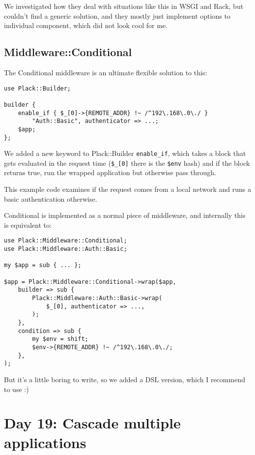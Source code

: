 We investigated how they deal with situations like this in WSGI and
Rack, but couldn't find a generic solution, and they mostly just
implement options to individual component, which did not look cool for
me.

\section{Middleware::Conditional}\label{middlewareconditional}

The Conditional middleware is an ultimate flexible solution to this:

\begin{lstlisting}
use Plack::Builder;

builder {
    enable_if { $_[0]->{REMOTE_ADDR} !~ /^192\.168\.0\./ }
        "Auth::Basic", authenticator => ...;
    $app;
};
\end{lstlisting}

We added a new keyword to Plack::Builder \lstinline!enable_if!, which
takes a block that gets evaluated in the request time (\lstinline!$_[0]!
there is the \lstinline!$env! hash) and if the block returns true, run
the wrapped application but otherwise pass through.

This example code examines if the request comes from a local network and
runs a basic authentication otherwise.

Conditional is implemented as a normal piece of middleware, and
internally this is equivalent to:

\begin{lstlisting}
use Plack::Middleware::Conditional;
use Plack::Middleware::Auth::Basic;

my $app = sub { ... };

$app = Plack::Middleware::Conditional->wrap($app,
    builder => sub {
        Plack::Middleware::Auth::Basic->wrap(
            $_[0], authenticator => ...,
        );
    },
    condition => sub {
        my $env = shift;
        $env->{REMOTE_ADDR} !~ /^192\.168\.0\./;
    },
);
\end{lstlisting}

But it's a little boring to write, so we added a DSL version, which I
recommend to use :)

\chapter{Day 19: Cascade multiple
applications}\label{day-19-cascade-multiple-applications}

